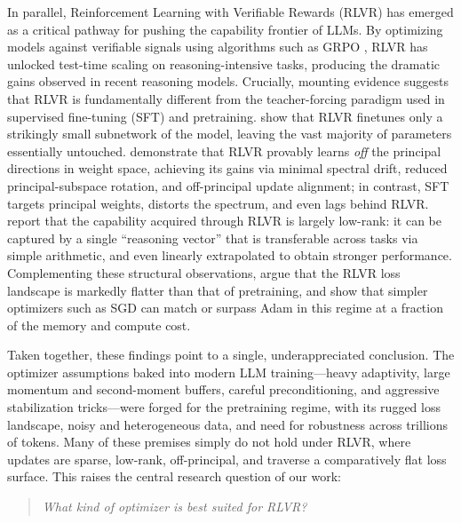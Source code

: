 \documentclass[11pt]{article}
\begin{document}
In parallel, Reinforcement Learning with Verifiable Rewards (RLVR) has emerged as a critical pathway for pushing the capability frontier of LLMs. By optimizing models against verifiable signals using algorithms such as GRPO \citep{shao2024grpo}, RLVR has unlocked test-time scaling on reasoning-intensive tasks, producing the dramatic gains observed in recent reasoning models. Crucially, mounting evidence suggests that RLVR is fundamentally different from the teacher-forcing paradigm used in supervised fine-tuning (SFT) and pretraining. \citet{rl_subnetworks} show that RLVR finetunes only a strikingly small subnetwork of the model, leaving the vast majority of parameters essentially untouched. \citet{path_not_taken} demonstrate that RLVR provably learns \emph{off} the principal directions in weight space, achieving its gains via minimal spectral drift, reduced principal-subspace rotation, and off-principal update alignment; in contrast, SFT targets principal weights, distorts the spectrum, and even lags behind RLVR. \citet{reasoning_vectors} report that the capability acquired through RLVR is largely low-rank: it can be captured by a single ``reasoning vector'' that is transferable across tasks via simple arithmetic, and even linearly extrapolated to obtain stronger performance. Complementing these structural observations, \citet{do_we_need_adam} argue that the RLVR loss landscape is markedly flatter than that of pretraining, and show that simpler optimizers such as SGD can match or surpass Adam in this regime at a fraction of the memory and compute cost.

Taken together, these findings point to a single, underappreciated conclusion. The optimizer assumptions baked into modern LLM training---heavy adaptivity, large momentum and second-moment buffers, careful preconditioning, and aggressive stabilization tricks---were forged for the pretraining regime, with its rugged loss landscape, noisy and heterogeneous data, and need for robustness across trillions of tokens. Many of these premises simply do not hold under RLVR, where updates are sparse, low-rank, off-principal, and traverse a comparatively flat loss surface. This raises the central research question of our work:

\begin{quote}
\emph{What kind of optimizer is best suited for RLVR?}
\end{quote}
\end{document}
